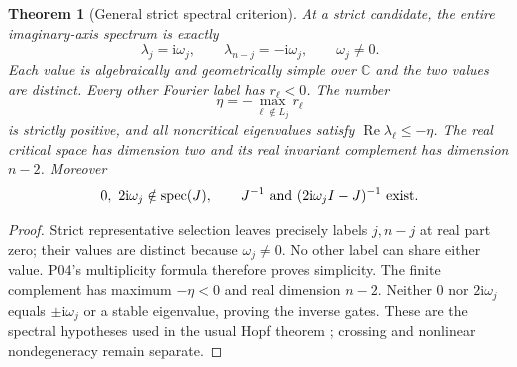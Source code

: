 \documentclass[11pt]{article}
\let\OriginalCite\cite
\renewcommand{\cite}[2][]{%
  \textcolor{CitationRed}{%
    \if\relax\detokenize{#1}\relax
      \OriginalCite{#2}%
    \else
      \OriginalCite[#1]{#2}%
    \fi}}
\newcommand{\C}{\mathbb{C}}
\newcommand{\ii}{\mathrm{i}}
\DeclareMathOperator{\spec}{spec}
\DeclareMathOperator{\Ree}{Re}
\newtheorem{theorem}{Theorem}[section]
\theoremstyle{definition}
\theoremstyle{remark}
\begin{document}
\begin{theorem}[General strict spectral criterion]
\label{thm:P11-strict}
At a strict candidate, the entire imaginary-axis spectrum is exactly
\begin{equation}
 \lambda_j=\ii\omega_j,\qquad
 \lambda_{n-j}=-\ii\omega_j,\qquad \omega_j\ne0.
 \label{eq:P11-critical-pair}
\end{equation}
Each value is algebraically and geometrically simple over $\C$ and the
two values are distinct. Every other Fourier label has $r_\ell<0$.
The number
\begin{equation}
 \eta=-\max_{\ell\notin L_j}r_\ell
 \label{eq:P11-gap}
\end{equation}
is strictly positive, and all noncritical eigenvalues satisfy
$\Ree\lambda_\ell\le-\eta$. The real critical space has dimension
two and its real invariant complement has dimension $n-2$.
Moreover
\begin{equation}
 0,\ 2\ii\omega_j\notin\spec(J),\qquad
 J^{-1}\ \hbox{and}\ (2\ii\omega_j I-J)^{-1}\ \hbox{exist}.
 \label{eq:P11-resolvent-gates}
\end{equation}
\end{theorem}
\begin{proof}
Strict representative selection leaves precisely labels $j,n-j$ at
real part zero; their values are distinct because $\omega_j\ne0$.
No other label can share either value. P04's multiplicity formula
therefore proves simplicity. The finite complement has maximum
$-\eta<0$ and real dimension $n-2$. Neither $0$ nor $2\ii\omega_j$
equals $\pm\ii\omega_j$ or a stable eigenvalue, proving the inverse gates.
These are the spectral hypotheses used in the usual Hopf theorem
\cite{KuznetsovHopf2006}; crossing and nonlinear nondegeneracy remain separate.
\end{proof}
\end{document}
